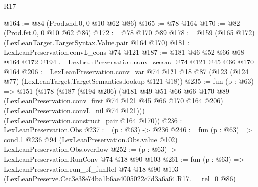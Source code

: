 \begin{lexlean}{R17}
\begin{coremodule}
@164 := @84 (Prod.snd.{0, 0} @10 @62 @86)
@165 := @78 @164
@170 := @82 (Prod.fst.{0, 0} @10 @62 @86)
@172 := @78 @170 @89
@178 := @159 (@165 @172) (LexLeanTarget.TargetSyntax.Value.pair @164 @170)
@181 := LexLeanPreservation.convL_cons @74 @121
@187 := @181 @46 @52 @66 @68 @164 @172
@194 := LexLeanPreservation.conv_second @74 @121 @45 @66 @170 @164
@206 := LexLeanPreservation.conv_var
    @74
    @121
    @18
    @87
    (@123 (@124 @77) (LexLeanTarget.TargetSemantics.lookup @121 @18))
@235 := fun (p : @63) =>
  @151
    (@178
      (@187
        (@194 @206)
        (@181
          @49
          @51
          @66
          @66
          @170
          @89
          (LexLeanPreservation.conv_first @74 @121 @45 @66 @170 @164 @206)
          (LexLeanPreservation.convL_nil @74 @121)))
      (LexLeanPreservation.construct_pair @164 @170))
@236 := LexLeanPreservation.Obs
@237 := (p : @63) -> @236
@246 := fun (p : @63) =>
  cond.{1} @236 @94 (LexLeanPreservation.Obs.value @102) LexLeanPreservation.Obs.overflow
@252 := (p : @63) -> LexLeanPreservation.RunConv @74 @18 @90 @103
@261 := fun (p : @63) =>
  LexLeanPreservation.run_of_funRel
    @74
    @18
    @90
    @103
    (LexLeanPreserve.Cec3e38e74ba1b6ae4005022c7d3a6a64.R17.__rel_0 @86)
\end{coremodule}
\end{lexlean}
